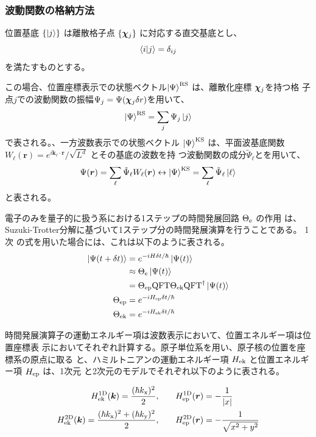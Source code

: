 \documentclass[wabun2025.tex]{subfiles}
\begin{document}
\subsubsection{波動関数の格納方法}
位置基底 $\{\ket{j}\}$ は離散格子点 $\{\bm{\chi}_{j}\}$ に対応する直交基底とし、
\begin{equation}
\braket{i|j}=\delta_{ij}
\end{equation}
を満たすものとする。

この場合、位置座標表示での状態ベクトル$\ket{\Psi}^{\mathrm{RS}}$ は、離散化座標 $\bm{\chi}_{j}$を持つ格
子点$j$での波動関数の振幅$\Psi_j=\Psi(\bm{\chi}_{j}\delta r)$を用いて、
\begin{equation}
\ket{\Psi}^{\mathrm{RS}} = \sum_{j}\Psi_j\ket{j}
\end{equation}
で表される。、一方波数表示での状態ベクトル $\ket{\Psi}^{\mathrm{KS}}$ は、平面波基底関数
$W_{\ell}(\bm{r})=e^{i\bm{k}_{\ell}\cdot\bm{r}}/\sqrt{L^d}$ とその基底の波数を持
つ波動関数の成分$\tilde{\Psi}_{\ell}$とを用いて、
\begin{equation}
\Psi(\bm{r})=\sum_{\ell} \tilde{\Psi}_{\ell}W_{\ell}(\bm{r})\leftrightarrow
\ket{\Psi}^{\mathrm{KS}} = \sum_{\ell}\tilde{\Psi}_{\ell}\ket{\ell}
\end{equation}
と表される。

電子のみを量子的に扱う系における1ステップの時間発展回路 $\Theta_{\mathrm{e}}$ の作用
は、Suzuki-Trotter分解に基づいて1ステップ分の時間発展演算を行うことである。 1次
の式を用いた場合には、これは以下のように表される。
\begin{align}
\ket{\Psi(t+\delta t)}
 &= e^{-iH\delta t/\hbar}\ket{\Psi(t)} \notag \\
 &\approx \Theta_{\mathrm{e}} \ket{\Psi(t)} \label{eq:circuit-eval-theta-e}\\
 &= \Theta_{\mathrm{ep}}\mathrm{QFT}\Theta_{\mathrm{ek}}\mathrm{QFT}^\dagger\ket{\Psi(t)}\\
    \Theta_{\mathrm{ep}}&=e^{-iH_{\mathrm{ep}}\delta t/\hbar}\\
    \Theta_{\mathrm{ek}}&=e^{-iH_{\mathrm{ek}}\delta t/\hbar}
\end{align}

時間発展演算子の運動エネルギー項は波数表示において、位置エネルギー項は位置座標表
示においてそれぞれ計算する。原子単位系を用い、原子核の位置を座標系の原点に取る
と、ハミルトニアンの運動エネルギー項 $H_{\mathrm{ek}}$ と位置エネルギー項 $H_{\mathrm{ep}}$ は、1次元
と2次元のモデルでそれぞれ以下のように表される。

\begin{align}
   H_{\mathrm{ek}}^{\mathrm{1D}}(\bm{k}) = \frac{(\hbar k_{\mathrm{x}})^2}{2}, \qquad &
   H_{\mathrm{ep}}^{\mathrm{1D}}(\bm{r}) = -\frac{1}{{\left| x \right|}} \label{eq:HkHp1D}\\
   H_{\mathrm{ek}}^{\mathrm{2D}}(\bm{k}) = \frac{(\hbar k_{\mathrm{x}})^2 + (\hbar k_{\mathrm{y}})^2}{2}, \qquad &
   H_{\mathrm{ep}}^{\mathrm{2D}}(\bm{r}) = -\frac{1}{\sqrt{x^2+y^2}} \label{eq:HkHp2D}
\end{align}
\end{document}
